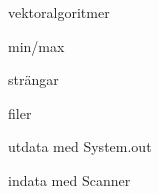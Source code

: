 \item vektoralgoritmer
\item min/max
\item strängar
\item filer
\item utdata med System.out
\item indata med Scanner